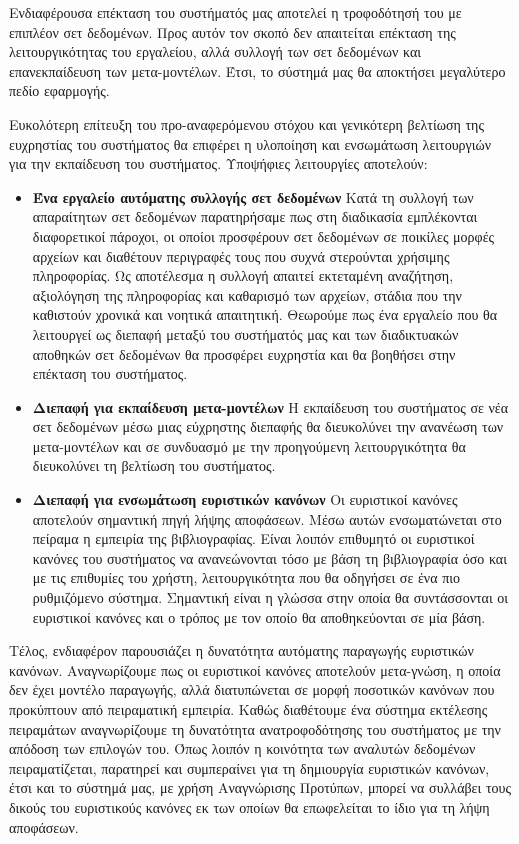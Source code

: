 Ενδιαφέρουσα επέκταση του συστήματός μας αποτελεί η τροφοδότησή του με επιπλέον σετ δεδομένων. Προς αυτόν τον σκοπό δεν απαιτείται επέκταση της λειτουργικότητας του εργαλείου, αλλά συλλογή των σετ δεδομένων και επανεκπαίδευση των μετα-μοντέλων. Έτσι, το σύστημά μας θα αποκτήσει μεγαλύτερο πεδίο εφαρμογής.

Ευκολότερη επίτευξη του προ-αναφερόμενου στόχου και γενικότερη βελτίωση της ευχρηστίας του συστήματος θα επιφέρει η υλοποίηση και ενσωμάτωση λειτουργιών για την εκπαίδευση του συστήματος. Υποψήφιες λειτουργίες αποτελούν:
\begin{itemize}
	\item \textbf{Ένα εργαλείο αυτόματης συλλογής σετ δεδομένων} Κατά τη συλλογή των απαραίτητων σετ δεδομένων παρατηρήσαμε πως στη διαδικασία εμπλέκονται διαφορετικοί πάροχοι, οι οποίοι προσφέρουν σετ δεδομένων σε ποικίλες μορφές αρχείων και διαθέτουν περιγραφές τους που συχνά στερούνται χρήσιμης πληροφορίας. Ως αποτέλεσμα η συλλογή απαιτεί εκτεταμένη αναζήτηση, αξιολόγηση της πληροφορίας και καθαρισμό των αρχείων, στάδια που την καθιστούν χρονικά και νοητικά απαιτητική. Θεωρούμε πως ένα εργαλείο που θα λειτουργεί ως διεπαφή μεταξύ του συστήματός μας και των διαδικτυακών αποθηκών σετ δεδομένων θα προσφέρει ευχρηστία και θα βοηθήσει στην επέκταση του συστήματος.
	\item \textbf{Διεπαφή για εκπαίδευση μετα-μοντέλων} Η εκπαίδευση του συστήματος σε νέα σετ δεδομένων μέσω μιας εύχρηστης διεπαφής θα διευκολύνει την ανανέωση των μετα-μοντέλων και σε συνδυασμό με την προηγούμενη λειτουργικότητα θα διευκολύνει τη βελτίωση του συστήματος.
	\item \textbf{Διεπαφή για ενσωμάτωση ευριστικών κανόνων} Οι ευριστικοί κανόνες αποτελούν σημαντική πηγή λήψης αποφάσεων. Μέσω αυτών ενσωματώνεται στο πείραμα η εμπειρία της βιβλιογραφίας. Είναι λοιπόν επιθυμητό οι ευριστικοί κανόνες του συστήματος να ανανεώνονται τόσο με βάση τη βιβλιογραφία όσο και με τις επιθυμίες του χρήστη, λειτουργικότητα που θα οδηγήσει σε ένα πιο ρυθμιζόμενο σύστημα. Σημαντική είναι η γλώσσα στην οποία θα συντάσσονται οι ευριστικοί κανόνες και ο τρόπος με τον οποίο θα αποθηκεύονται σε μία βάση. 
\end{itemize}

Τέλος, ενδιαφέρον παρουσιάζει η δυνατότητα αυτόματης παραγωγής ευριστικών κανόνων. Αναγνωρίζουμε πως οι ευριστικοί κανόνες αποτελούν μετα-γνώση, η οποία δεν έχει μοντέλο παραγωγής, αλλά διατυπώνεται σε μορφή ποσοτικών κανόνων που προκύπτουν από πειραματική εμπειρία. Καθώς διαθέτουμε ένα σύστημα εκτέλεσης πειραμάτων αναγνωρίζουμε τη δυνατότητα ανατροφοδότησης του συστήματος με την απόδοση των επιλογών του. Όπως λοιπόν η κοινότητα των αναλυτών δεδομένων πειραματίζεται, παρατηρεί και συμπεραίνει για τη δημιουργία ευριστικών κανόνων, έτσι και το σύστημά μας, με χρήση Αναγνώρισης Προτύπων, μπορεί να συλλάβει τους δικούς του ευριστικούς κανόνες εκ των οποίων θα επωφελείται το ίδιο για τη λήψη αποφάσεων. 
